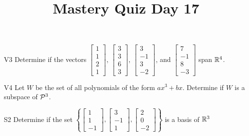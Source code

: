 \documentclass{sbgLAquiz}
\title{Mastery Quiz Day 17 }
\begin{document}
\begin{problem}{V3}
Determine if the vectors $\begin{bmatrix} 1 \\ 1 \\ 2 \\1 \end{bmatrix}$, $\begin{bmatrix} 3 \\ 3 \\ 6 \\ 3 \end{bmatrix}$, $\begin{bmatrix}3 \\ -1 \\ 3 \\ -2\end{bmatrix}$, and $\begin{bmatrix} 7 \\ -1 \\ 8 \\ -3 \end{bmatrix}$  span $\IR^4$.
\end{problem}

\begin{problem}{V4} Let $W$ be the set of all polynomials of the form
\(ax^3+bx\).  Determine if $W$ is a subspace of \(\P^3\).
\end{problem}
\newpage

\begin{problem}{S2}
Determine if the set $\left\{\begin{bmatrix} 1 \\ 1 \\ -1 \end{bmatrix}, \begin{bmatrix} 3 \\ -1 \\ 1 \end{bmatrix},\begin{bmatrix} 2 \\ 0 \\ -2 \end{bmatrix}\right\}$ is a basis of $\IR^3$
\end{problem}
\end{document}
